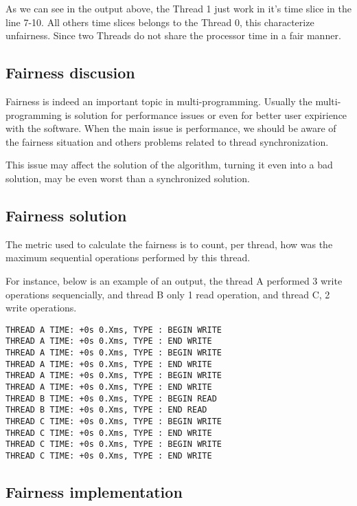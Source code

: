 \documentclass{article}
\begin{document}
As we can see in the output above, the Thread 1 just work in it's time slice in the line 7-10. All
others time slices belongs to the Thread 0, this characterize unfairness. Since two Threads do not
share the processor time in a fair manner.

\subsection{Fairness discusion}

Fairness is indeed an important topic in multi-programming. Usually the multi-programming
is solution for performance issues or even for better user expirience with the software. 
When the main issue is performance, we should be aware of the fairness situation and others problems related
to thread synchronization. 

This issue may affect the solution of the algorithm, turning it even into a bad solution, may be even worst
than a synchronized solution.

\subsection{Fairness solution}

The metric used to calculate the fairness is to count, per thread, how was the maximum sequential operations
performed by this thread. 

For instance, below is an example of an output, the thread A performed 3 write operations sequencially, and 
thread B only 1 read operation, and thread C, 2 write operations.

\begin{lstlisting}
THREAD A TIME: +0s 0.Xms, TYPE : BEGIN WRITE 
THREAD A TIME: +0s 0.Xms, TYPE : END WRITE 
THREAD A TIME: +0s 0.Xms, TYPE : BEGIN WRITE 
THREAD A TIME: +0s 0.Xms, TYPE : END WRITE 
THREAD A TIME: +0s 0.Xms, TYPE : BEGIN WRITE 
THREAD A TIME: +0s 0.Xms, TYPE : END WRITE 
THREAD B TIME: +0s 0.Xms, TYPE : BEGIN READ 
THREAD B TIME: +0s 0.Xms, TYPE : END READ 
THREAD C TIME: +0s 0.Xms, TYPE : BEGIN WRITE 
THREAD C TIME: +0s 0.Xms, TYPE : END WRITE 
THREAD C TIME: +0s 0.Xms, TYPE : BEGIN WRITE 
THREAD C TIME: +0s 0.Xms, TYPE : END WRITE 
\end{lstlisting}

	\subsection{Fairness implementation}
\end{document}
